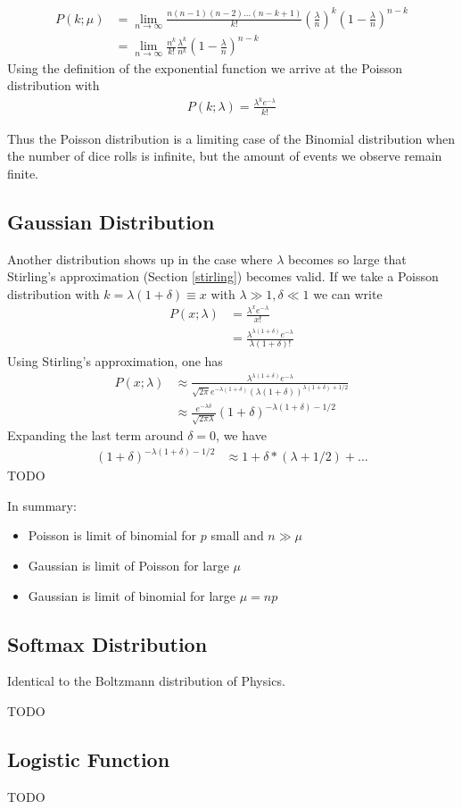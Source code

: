 \begin{align}
P(k; \mu) &= \lim_{n\to \infty} \frac{n(n-1)(n-2)...(n-k+1)}{k!}\left(\frac{\lambda}{n}\right)^k\left(1-\frac{\lambda}{n}\right)^{n-k}\\
&= \lim_{n\to \infty}\frac{n^k}{k!}\frac{\lambda^k}{n^k}\left(1-\frac{\lambda}{n}\right)^{n-k}
\end{align}
Using the definition of the exponential function we arrive at the Poisson distribution with
\begin{align}
P(k; \lambda) = \frac{\lambda^ke^{-\lambda}}{k!}
\end{align}

Thus the Poisson distribution is a limiting case of the Binomial distribution when the number of dice rolls is infinite, but the amount of events we observe remain finite.


\subsection{Gaussian Distribution}
Another distribution shows up in the case where $\lambda$ becomes so large that Stirling's approximation (Section \ref{stirling}) becomes valid. If we take a Poisson distribution with  $k = \lambda(1+\delta) \equiv x$ with $\lambda \gg 1, \delta \ll 1$ we can write
\begin{align}
	P(x; \lambda) &= \frac{\lambda^xe^{-\lambda}}{x!}\\
	&= \frac{\lambda^{\lambda(1+\delta)}e^{-\lambda}}{\lambda(1+\delta)!}
\end{align}
Using Stirling's approximation, one has
\begin{align}
		P(x; \lambda) &\approx \frac{\lambda^{\lambda(1+\delta)}e^{-\lambda}}{\sqrt{2\pi}e^{-\lambda(1+\delta)}(\lambda(1+\delta))^{\lambda(1+\delta)+1/2}}\\
		&\approx \frac{e^{-\lambda\delta}}{\sqrt{2\pi\lambda}} (1+\delta)^{-\lambda(1+\delta)-1/2}
\end{align}
Expanding the last term around $\delta=0$, we have
\begin{align}
	(1+\delta)^{-\lambda(1+\delta)-1/2} &\approx 1 + \delta*(\lambda+1/2) + \dots
\end{align} 
TODO

In summary:
\begin{itemize}
	\item Poisson is limit of binomial for $p$ small and $n\gg \mu$
	\item Gaussian is limit of Poisson for large $\mu$
	\item Gaussian is limit of binomial for large $\mu=np$
\end{itemize}

\subsection{Softmax Distribution}
Identical to the Boltzmann distribution of Physics.

TODO

\subsection{Logistic Function}\label{logistic_function}
TODO
